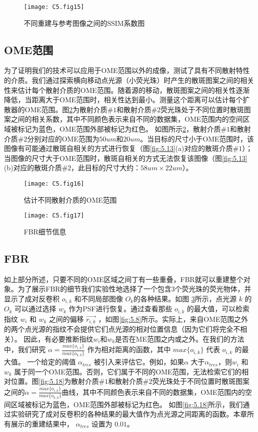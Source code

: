 \begin{figure}[htp]
	\centering
	\texttt{[image: C5.fig15]}
	\caption{不同重建与参考图像之间的SSIM系数图}
	\label{fig:5.15}
\end{figure}

\subsection{OME范围}

为了证明我们的技术可以应用于OME范围以外的成像，测试了具有不同散射特性的介质。我们通过探索横向移动点光源（小荧光珠）时产生的散斑图案之间的相关性来估计每个散射介质的OME范围。随着源的移动，散斑图案之间的相关性逐渐降低，当距离大于OME范围时，相关性达到最小。测量这个距离可以估计每个扩散器的OME范围。图\ref{fig:5.16}为散射介质$\# 1$和散射介质$\# 2$荧光珠处于不同位置时散斑图案之间的相关系数，其中不同颜色表示来自不同的数据集，OME范围内的空间区域被标记为蓝色，OME范围外部被标记为红色。
如图所示\ref{fig:5.16}，散射介质$\# 1$和散射介质$\# 2$分别对应的OME范围为$50 um$和$20 um$。当目标的尺寸小于OME范围时，该图像有可能通过散斑自相关的方式进行恢复（图\ref{fig:5.13}(a)对应的散斑介质$\# 1$）；当图像的尺寸大于OME范围时，散斑自相关的方式无法恢复该图像（图\ref{fig:5.13}(b)对应的散斑介质$\# 2$，此目标的尺寸大约：$ 58 um \times 22 um $）。

\begin{figure}[htp]
	\centering
	\texttt{[image: C5.fig16]}
	\caption{估计不同散射介质的OME范围}
	\label{fig:5.16}
\end{figure}

\begin{figure}[htp]
	\centering
	\texttt{[image: C5.fig17]}
	\caption{FBR细节信息}
	\label{fig:5.17}
\end{figure}

\subsection{FBR}

如上部分所述，只要不同的OME区域之间丁有一些重叠，FBR就可以重建整个对象。为了展示FBR的细节我们实验性地选择了一个包含3个荧光珠的荧光物体，并显示了成对反卷积 $o_{i,k}$ 和不同局部图像 $O_{k}$的各种结果。如图 \ref{fig:5.17}所示，点光源 $k$ 的 $O_{k}$ 可以通过选择 $w_{k}$ 作为PSF进行恢复。通过查看那些 $o_{i,k}$ 的最大值，可以检索指纹 $w_{i}$ 和 $w_{k}$ 之间的偏移 $\vec{r_{i,k}}$ ，如图\ref{fig:5.8}所示。实际上，来自OME范围之外的两个点光源的指纹不会提供它们点光源的相对位置信息（因为它们将完全不相关）。
因此，有必要推断指纹$w_{i}$和$w_{k}$是否在ME范围之内或之外。在我们的方法中，我们研究 $\alpha= \frac {max\{o_{i,k}\}} {max\{o_{k,k}\}}$ 作为相对距离的函数，其中 $max \{ o_{i,k} \}$ 代表 $o_{i,k}$ 的最大值。
一个给定的阈值 $\alpha_{tres}$ 被引入来评估它。例如，如果$\alpha$ 大于$\alpha_{tres}$，则$w_{i}$ 和$w_{k}$ 属于同一个OME范围。否则，它们属于不同的OME范围，无法检索它们的相对位置。图\ref{fig:5.18}为散射介质$\# 1$和散射介质$\# 2$荧光珠处于不同位置时散斑图案之间的$\alpha= \frac {max\{o_{i,k}\}} {max\{o_{k,k}\}}$曲线，其中不同颜色表示来自不同的数据集，OME范围内的空间区域被标记为蓝色，OME范围外部被标记为红色。
如图\ref{fig:5.18}所示，我们通过实验研究了成对反卷积的各种结果的最大值作为点光源之间距离的函数。本章所有展示的重建结果中， $\alpha_{tres}$ 设置为 $0.01$。

